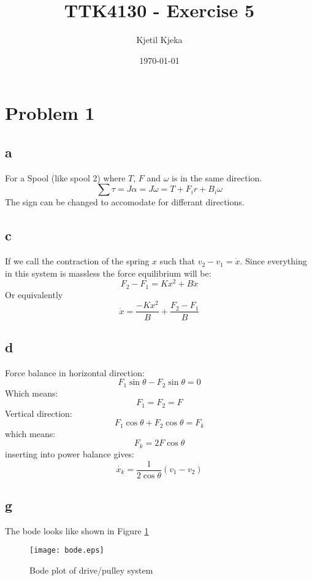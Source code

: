 \documentclass[11pt]{article}
\author{Kjetil Kjeka}
\title{TTK4130 - Exercise 5}
\date{\today}
\begin{document}
\maketitle
\section*{Problem 1}
\subsection*{a}
For a Spool (like spool 2) where $T$, $F$ and $\omega$ is in the same direction.
\[\sum \tau = J \alpha = J \dot{\omega} = T + F_i r + B_i \omega \]
The sign can be changed to accomodate for differant directions.

\subsection*{c}
If we call the contraction of the spring $x$ such that $v_2 - v_1 = \dot{x}$. Since everything in this system is massless the force equilibrium will be:
\[ F_2 - F_1 = K x^2 + B \dot{x} \]
Or equivalently
\[ \dot{x} = \frac{-K x^2}{B} + \frac{F_2 - F_1}{B} \]

\subsection*{d}
Force balance in horizontal direction:
\[F_1 \sin{\theta} - F_2 \sin{\theta} = 0\]
Which means:
\[F_1 = F_2 = F \]
Vertical direction:
\[ F_1 \cos{\theta} + F_2 \cos{\theta} = F_k \]
which means:
\[ F_k = 2 F \cos{\theta} \]
inserting into power balance gives:
\[\dot{x_k} = \frac{1}{2 \cos{\theta}} (v_1 - v_2)\]

\subsection*{g}
The bode looks like shown in Figure \ref{fig:bode}
\begin{figure}[h]
\centering
\texttt{[image: bode.eps]}
\caption{Bode plot of drive/pulley system}
\label{fig:bode}
\end{figure}
\end{document}
